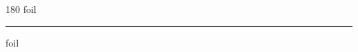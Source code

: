 
\begin{frame}
\begin{center}
\begin{turn}{180}
{\fontsize{2.5cm}{1em}\selectfont foil}
\end{turn}
\vspace{1em}\par  
\hrule
\vspace{1em}\par  
{\fontsize{2.5cm}{1em}\selectfont foil}
\end{center}
\end{frame}
